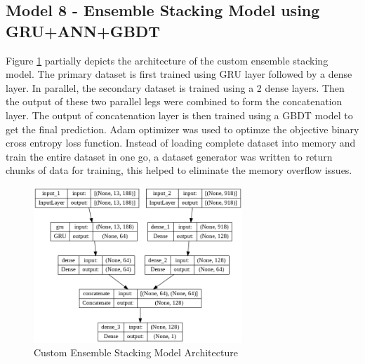 \documentclass[twoside,11pt,a4paper]{article}
\begin{document}
\subsection{Model 8 - Ensemble Stacking Model using \acs{GRU}+\acs{ANN}+\acs{GBDT}}
Figure \ref{fig:gru_nn_gbdt_arch} partially depicts the architecture of the custom ensemble stacking model. The primary dataset is first trained using \acs{GRU} layer followed by a dense layer. In parallel, the secondary dataset is trained using a 2 dense layers. Then the output of these two parallel legs were combined to form the concatenation layer. The output of concatenation layer is then trained using a  \acs{GBDT} model to get the final prediction. Adam optimizer was used to optimze the objective binary cross entropy loss function. Instead of loading complete dataset into memory and train the entire dataset in one go, a dataset generator was written to return chunks of data for training, this helped to eliminate the memory overflow issues.\\
\begin{figure}[ht]
	\centering
	\includegraphics[width=0.7\textwidth, height=0.3\textheight]{GRU_NN_GBDT_Architecture}
	\caption[Custom Ensemble Stacking Model Architecture]{Custom Ensemble Stacking Model Architecture}
	\label{fig:gru_nn_gbdt_arch}
\end{figure}
\FloatBarrier
\end{document}
